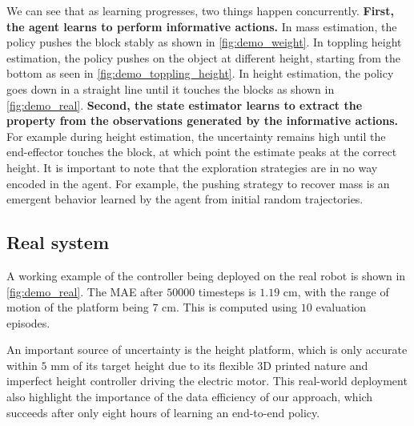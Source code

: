 \documentclass[anon]{l4dc2024}
\begin{document}
We can see that as learning progresses, two things happen concurrently.
\textbf{First, the agent learns to perform informative actions.}
In mass estimation, the policy pushes the block stably as shown in \autoref{fig:demo_weight}.
In toppling height estimation, the policy pushes on the object at different height, starting from the bottom as seen in \autoref{fig:demo_toppling_height}.
In height estimation, the policy goes down in a straight line until it touches the blocks as shown in \autoref{fig:demo_real}.
\textbf{Second, the state estimator learns to extract the property from the observations generated by the informative actions.}
For example during height estimation, the uncertainty remains high until the end-effector touches the block, at which point the estimate peaks at the correct height.
It is important to note that the exploration strategies are in no way encoded in the agent. For example, the pushing strategy to recover mass is an emergent behavior learned by the agent from  initial random trajectories.

\subsection{Real system}
A working example of the controller being deployed on the real robot is shown in \autoref{fig:demo_real}. The \ac{MAE} after $50 000$ timesteps is $1.19$ cm, with the range of motion of the platform being $7$ cm.
This is computed using $10$ evaluation episodes.

An important source of uncertainty is the height platform, which is only accurate within $5$ mm of its target height due to its flexible 3D printed nature and imperfect height controller driving the electric motor.
This real-world deployment also highlight the importance of the data efficiency of our approach, which succeeds after only eight hours of learning an end-to-end policy.
\end{document}
